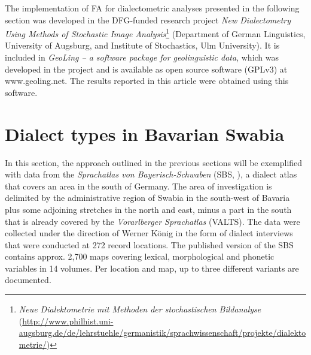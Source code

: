 \documentclass[output=paper]{LSP/langsci}
\begin{document}
The implementation of FA for dialectometric analyses presented in the following section was developed in the DFG-funded research project \textit{New Dialectometry Using Methods of Stochastic Image Analysis}\footnote{\textit{Neue Dialektometrie mit Methoden der stochastischen Bildanalyse} \\
(\url{http://www.philhist.uni-augsburg.de/de/lehrstuehle/germanistik/sprachwissenschaft/projekte/dialektometrie/})} (Department of German Linguistics, University of Augsburg, and Institute of Stochastics, Ulm University). It is included in \textit{GeoLing – a software package for geolinguistic data}, which was developed in the project and is available as open source software (GPLv3) at www.geoling.net. The results reported in this article were obtained using this software.

\section{Dialect types in Bavarian Swabia}

In this section, the approach outlined in the previous sections will be exemplified with data from the \textit{Sprachatlas von Bayerisch-Schwaben} (SBS, \citealt{konig_sprachatlas_1996}), a dialect atlas that covers an area in the south of Germany. The area of investigation is delimited by the administrative region of Swabia in the south-west of Bavaria plus some adjoining stretches in the north and east, minus a part in the south that is already covered by the \textit{Vorarlberger Sprachatlas} (VALTS). The data were collected under the direction of Werner König in the form of dialect interviews that were conducted at 272 record locations. The published version of the SBS contains approx. 2,700 maps covering lexical, morphological and phonetic variables in 14 volumes. Per location and map, up to three different variants are documented.
\end{document}
